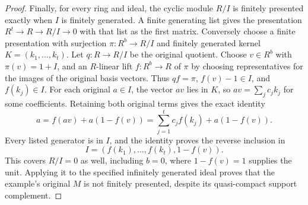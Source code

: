 \begin{proof}
Finally, for every ring and ideal, the cyclic module
$R/I$ is finitely presented exactly when $I$ is
finitely generated. A finite generating list gives
the presentation $R^t\to R\to R/I\to0$ with that
list as the first matrix. Conversely choose a finite
presentation with surjection $\pi:R^b\to R/I$ and
finitely generated kernel $K=(k_1,\ldots,k_t)$.
Let $q:R\to R/I$ be the original quotient. Choose
$v\in R^b$ with $\pi(v)=1+I$, and an $R$-linear
lift $f:R^b\to R$ of $\pi$ by choosing representatives
for the images of the original basis vectors.
Thus $qf=\pi$, $f(v)-1\in I$, and $f(k_j)\in I$.
For each original $a\in I$, the vector $av$ lies
in $K$, so $av=\sum_j c_jk_j$ for some coefficients.
Retaining both original terms gives the exact identity
$$
a=f(av)+a(1-f(v))
=\sum_{j=1}^t c_jf(k_j)+a(1-f(v)).
$$
Every listed generator is in $I$, and the identity
proves the reverse inclusion in
$$
I=(f(k_1),\ldots,f(k_t),1-f(v)).
$$
This covers $R/I=0$ as well, including $b=0$, where
$1-f(v)=1$ supplies the unit. Applying it to the
specified infinitely generated ideal proves that the
example's original $M$ is not finitely presented,
despite its quasi-compact support complement.
\end{proof}